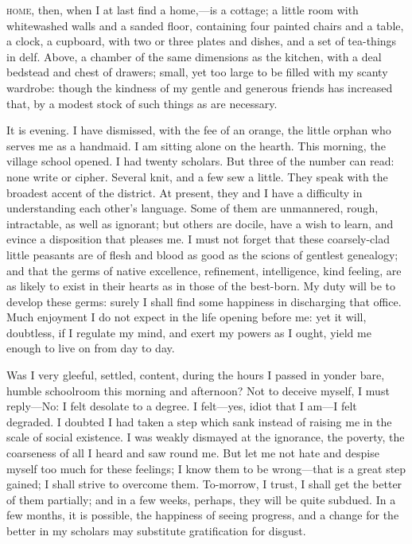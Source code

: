 
 \textsc{home,} then, when I at last find a home,---is a cottage; a little room
with whitewashed walls and a sanded floor, containing four painted
chairs and a table, a clock, a cupboard, with two or three plates and
dishes, and a set of tea-things in delf. Above, a chamber of the same
dimensions as the kitchen, with a deal bedstead and chest of drawers;
small, yet too large to be filled with my scanty wardrobe: though the
kindness of my gentle and generous friends has increased that, by a
modest stock of such things as are necessary.

It is evening. I have dismissed, with the fee of an orange, the little
orphan who serves me as a handmaid. I am sitting alone on the hearth.
This morning, the village school opened. I had twenty scholars. But
three of the number can read: none write or cipher. Several knit, and a
few sew a little. They speak with the broadest accent of the district.
At present, they and I have a difficulty in understanding each other's
language. Some of them are unmannered, rough, intractable, as well as
ignorant; but others are docile, have a wish to learn, and evince a
disposition that pleases me. I must not forget that these coarsely-clad
little peasants are of flesh and blood as good as the scions of gentlest
genealogy; and that the germs of native excellence, refinement,
intelligence, kind feeling, are as likely to exist in their hearts as in
those of the best-born. My duty will be to develop these germs: surely
I shall find some happiness in discharging that office. Much enjoyment
I do not expect in the life opening before me: yet it will, doubtless,
if I regulate my mind, and exert my powers as I ought, yield me enough
to live on from day to day.

Was I very gleeful, settled, content, during the hours I passed in
yonder bare, humble schoolroom this morning and afternoon? Not to
deceive myself, I must reply---No: I felt desolate to a degree. I
felt---yes, idiot that I am---I felt degraded. I doubted I had taken a
step which sank instead of raising me in the scale of social existence.
I was weakly dismayed at the ignorance, the poverty, the coarseness of
all I heard and saw round me. But let me not hate and despise myself
too much for these feelings; I know them to be wrong---that is a great
step gained; I shall strive to overcome them. To-morrow, I trust, I
shall get the better of them partially; and in a few weeks, perhaps,
they will be quite subdued. In a few months, it is possible, the
happiness of seeing progress, and a change for the better in my scholars
may substitute gratification for disgust.

